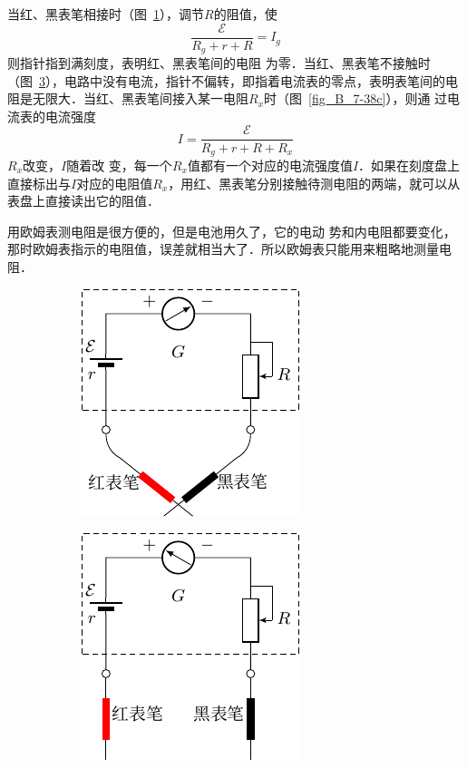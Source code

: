 当红、黑表笔相接时（图~\ref{fig_B_7-38a}），调节$R$的阻值，使
\[\frac{\mathcal{E}}{R_g+r+R}=I_g\]
则指针指到满刻度，表明红、黑表笔间的电阻
为零．当红、黑表笔不接触时（图~\ref{fig_B_7-38b}），电路中没有电流，指针不偏转，即指着电流表的零点，表明表笔间的电阻是无限大．当红、黑表笔间接入某一电阻$R_x$时（图~\ref{fig_B_7-38c}），则通
过电流表的电流强度
\[I=\frac{\mathcal{E}}{R_g+r+R+R_x}\]
$R_x$改变，$I$随着改
变，每一个$R_x$值都有一个对应的电流强度值$I$．如果在刻度盘上直接标出与$I$对应的电阻值$R_x$，用红、黑表笔分别接触待测电阻的两端，就可以从表盘上直接读出它的阻值．

用欧姆表测电阻是很方便的，但是电池用久了，它的电动
势和内电阻都要变化，那时欧姆表指示的电阻值，误差就相当大了．所以欧姆表只能用来粗略地测量电阻．

\begin{figure}[htbp]
    \centering
    \begin{subfigure}{0.3\linewidth}
        \centering
        \includegraphics{fig/B/7-38a.pdf}
        \caption{}\label{fig_B_7-38a}
    \end{subfigure}
    \hfil
    \begin{subfigure}{0.3\linewidth}
        \centering
        \includegraphics{fig/B/7-38b.pdf}
        \caption{}\label{fig_B_7-38b}
    \end{subfigure}

\end{figure}
